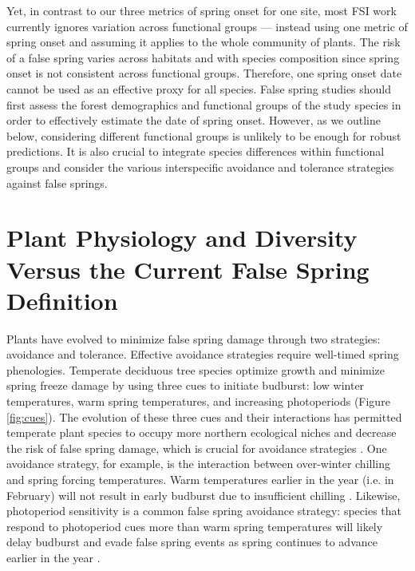 \documentclass{article}\usepackage[]{graphicx}\usepackage[]{color}
\begin{document}
Yet, in contrast to our three metrics of spring onset for one site, most FSI work currently ignores variation across functional groups --- instead using one metric of spring onset and assuming it applies to the whole community of plants. The risk of a false spring varies across habitats and with species composition since spring onset is not consistent across functional groups. Therefore, one spring onset date cannot be used as an effective proxy for all species. False spring studies should first assess the forest demographics and functional groups of the study species in order to effectively estimate the date of spring onset. However, as we outline below, considering different functional groups is unlikely to be enough for robust predictions. It is also crucial to integrate species differences within functional groups and consider the various interspecific avoidance and tolerance strategies against false springs. %

\section {Plant Physiology and Diversity Versus the Current False Spring Definition}
Plants have evolved to minimize false spring damage through two strategies: avoidance and tolerance. Effective avoidance strategies require well-timed spring phenologies. Temperate deciduous tree species optimize growth and minimize spring freeze damage by using three cues to initiate budburst: low winter temperatures, warm spring temperatures, and increasing photoperiods \citep{Cleland2007, Polgar2011} (Figure \ref{fig:cues}). The evolution of these three cues and their interactions has permitted temperate plant species to occupy more northern ecological niches and decrease the risk of false spring damage, which is crucial for avoidance strategies \citep{Samish1954}. One avoidance strategy, for example, is the interaction between over-winter chilling and spring forcing temperatures. Warm temperatures earlier in the year (i.e. in February) will not result in early budburst due to insufficient chilling \citep{Basler2012}. Likewise, photoperiod sensitivity is a common false spring avoidance strategy: species that respond to photoperiod cues more than warm spring temperatures will likely delay budburst and evade false spring events as spring continues to advance earlier in the year \citep{Basler2014}. 
\end{document}
